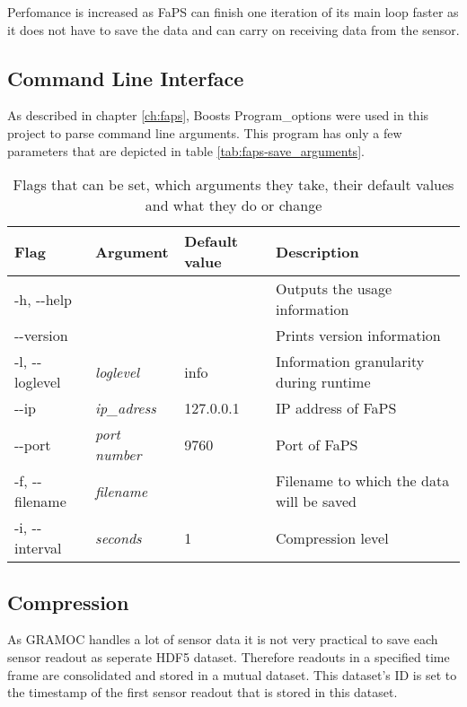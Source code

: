 Perfomance is increased as FaPS can finish one iteration of its main loop faster as it does not have to save the data and can carry on receiving data from the sensor.

\subsection{Command Line Interface}

As described in chapter \vref{ch:faps}, Boosts Program\_options were used in this project to parse command line arguments. This program has only a few parameters that are depicted in table \vref{tab:faps-save_arguments}.

\begin{table}[h]
    \centering
    \begin{tabular}{| l | l | l | p{5cm} |}
    \hline
    \textbf{Flag} & \textbf{Argument} & \textbf{Default value} & \textbf{Description} \\ \hline
    -h, -{}-help & & & Outputs the usage information \\ \hline
    -{}-version & & & Prints version information \\ \hline
    -l, -{}-loglevel & \textit{loglevel} & info & Information granularity during runtime \\ \hline
    -{}-ip & \textit{ip\_adress} & 127.0.0.1 & IP address of FaPS \\ \hline
    -{}-port & \textit{port number} & 9760 & Port of FaPS \\ \hline
    -f, -{}-filename & \textit{filename} & & Filename to which the data will be saved \\ \hline
    -i, -{}-interval & \textit{seconds} & 1 & Compression level \\ \hline
    \end{tabular}
    \caption{Flags that can be set, which arguments they take, their default values and what they do or change}
    \label{tab:faps-save_arguments}
\end{table}

\subsection{Compression}

As GRAMOC handles a lot of sensor data it is not very practical to save each sensor readout as seperate HDF5 dataset. Therefore readouts in a specified time frame are consolidated and stored in a mutual dataset. This dataset's ID is set to the timestamp of the first sensor readout that is stored in this dataset.
